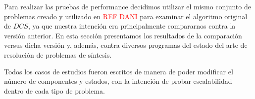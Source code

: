 
Para realizar las pruebas de performance decidimos utilizar el mismo conjunto de problemas creado y utilizado en \textcolor{red}{REF DANI} para examinar el algoritmo original de $DCS$, ya que nuestra intención era principalmente compararnos contra la versión anterior. En esta sección presentamos los resultados de la comparación versus dicha versión y, además, contra diversos programas del estado del arte de resolución de problemas de síntesis.

Todos los casos de estudios fueron escritos de manera de poder modificar el número de componentes y estados, con la intención de probar escalabilidad dentro de cada tipo de problema.
